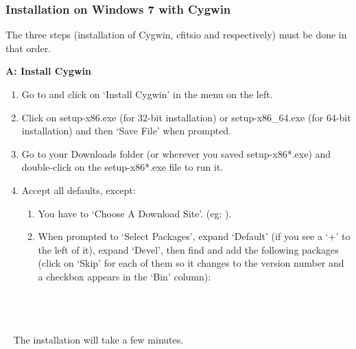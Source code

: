 \documentclass[12pt,twoside]{article}
\begin{document}
\subsubsection{Installation on Windows 7 with Cygwin}
\label{sec:windows_seven}
The three steps (installation of Cygwin, cfitsio and \healpix respectively) must be done in that order.

\textbf{A: Install Cygwin}
\begin{enumerate}
	\setlength{\itemsep}{-1pt}
	\setlength{\parsep}{-10pt}
\item Go to 
and click on `Install Cygwin' in the menu on the left.

\item Click on setup-x86.exe (for 32-bit installation) or setup-x86\_64.exe
(for 64-bit installation) and then `Save File' when prompted.

\item Go to your Downloads folder (or wherever you saved setup-x86*.exe) and
double-click on the setup-x86*.exe file to run it.

\item Accept all defaults, except:

\begin{enumerate}
	\setlength{\itemsep}{-1pt}
	\setlength{\parsep}{-10pt}
\item
  You have to `Choose A Download Site'. (eg:
  ).
\item
  When prompted to `Select Packages', expand `Default' (if you see a `+'
  to the left of it), expand `Devel', then find and add the following
  packages (click on `Skip' for each of them so it changes to the
  version number and a checkbox appears in the `Bin' column):\\
 \\
 \\
 \\
\end{enumerate}
\end{enumerate}
~ The installation will take a few minutes.
\end{document}
